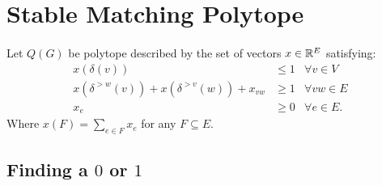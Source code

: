 \documentclass[preprint]{elsarticle}
\begin{document}
\section{Stable Matching Polytope}
\paragraph{}
Let $Q(G)$ be polytope described by the set of vectors $x \in \mathbb{R}^E$ satisfying:
\begin{align*}
x(\delta(v)) &\leq 1 &\forall v \in V\\
x(\delta^{>w}(v))+ x(\delta^{>v}(w)) + x_{vw} &\geq 1 &\forall vw \in E \\
x_e &\geq 0 &\forall e \in E.
\end{align*}
Where $x(F) = \sum_{e \in F} x_e$ for any $F \subseteq E$.
\subsection{Finding a $0$ or $1$}
\end{document}
